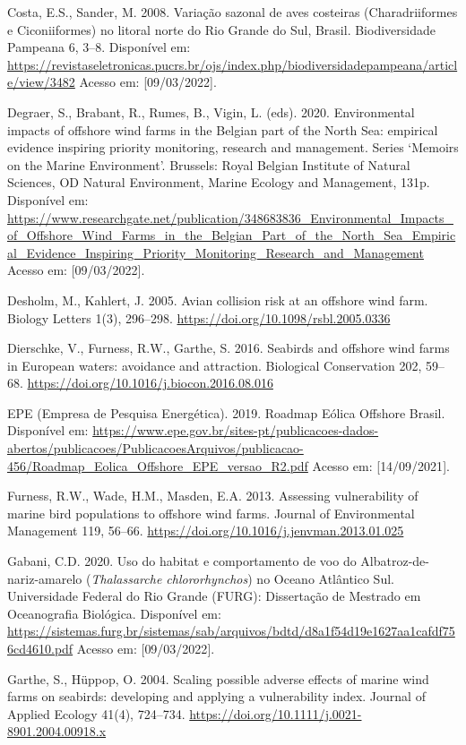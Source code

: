 \documentclass[
  oneside]{scrbook}
\begin{document}
Costa, E.S., Sander, M. 2008. Variação sazonal de aves costeiras (Charadriiformes e Ciconiiformes) no litoral norte do Rio Grande do Sul, Brasil. Biodiversidade Pampeana 6, 3--8. Disponível em: \url{https://revistaseletronicas.pucrs.br/ojs/index.php/biodiversidadepampeana/article/view/3482} Acesso em: {[}09/03/2022{]}.

Degraer, S., Brabant, R., Rumes, B., Vigin, L. (eds). 2020. Environmental impacts of offshore wind farms in the Belgian part of the North Sea: empirical evidence inspiring priority monitoring, research and management. Series `Memoirs on the Marine Environment'. Brussels: Royal Belgian Institute of Natural Sciences, OD Natural Environment, Marine Ecology and Management, 131p. Disponível em: \url{https://www.researchgate.net/publication/348683836_Environmental_Impacts_of_Offshore_Wind_Farms_in_the_Belgian_Part_of_the_North_Sea_Empirical_Evidence_Inspiring_Priority_Monitoring_Research_and_Management} Acesso em: {[}09/03/2022{]}.

Desholm, M., Kahlert, J. 2005. Avian collision risk at an offshore wind farm. Biology Letters 1(3), 296--298. \url{https://doi.org/10.1098/rsbl.2005.0336}

Dierschke, V., Furness, R.W., Garthe, S. 2016. Seabirds and offshore wind farms in European waters: avoidance and attraction. Biological Conservation 202, 59--68. \url{https://doi.org/10.1016/j.biocon.2016.08.016}

EPE (Empresa de Pesquisa Energética). 2019. Roadmap Eólica Offshore Brasil. Disponível em: \url{https://www.epe.gov.br/sites-pt/publicacoes-dados-abertos/publicacoes/PublicacoesArquivos/publicacao-456/Roadmap_Eolica_Offshore_EPE_versao_R2.pdf} Acesso em: {[}14/09/2021{]}.

Furness, R.W., Wade, H.M., Masden, E.A. 2013. Assessing vulnerability of marine bird populations to offshore wind farms. Journal of Environmental Management 119, 56--66. \url{https://doi.org/10.1016/j.jenvman.2013.01.025}

Gabani, C.D. 2020. Uso do habitat e comportamento de voo do Albatroz-de-nariz-amarelo (\emph{Thalassarche chlororhynchos}) no Oceano Atlântico Sul. Universidade Federal do Rio Grande (FURG): Dissertação de Mestrado em Oceanografia Biológica. Disponível em: \url{https://sistemas.furg.br/sistemas/sab/arquivos/bdtd/d8a1f54d19e1627aa1cafdf756cd4610.pdf} Acesso em: {[}09/03/2022{]}.

Garthe, S., Hüppop, O. 2004. Scaling possible adverse effects of marine wind farms on seabirds: developing and applying a vulnerability index. Journal of Applied Ecology 41(4), 724--734. \url{https://doi.org/10.1111/j.0021-8901.2004.00918.x}
\end{document}
